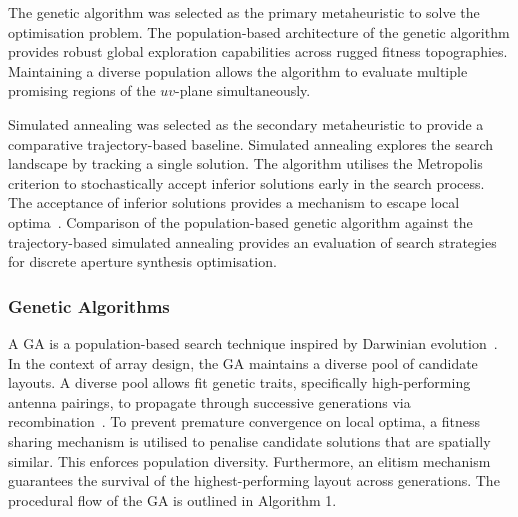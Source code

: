 \documentclass[conference]{IEEEtran}
\begin{document}
The genetic algorithm was selected as the primary metaheuristic to solve the optimisation problem. 
The population-based architecture of the genetic algorithm provides robust global exploration capabilities 
across rugged fitness topographies. Maintaining a diverse population allows the algorithm to evaluate multiple 
promising regions of the $uv$-plane simultaneously. 

Simulated annealing was selected as the secondary metaheuristic to provide a comparative trajectory-based 
baseline. Simulated annealing explores the search landscape by tracking a single solution. 
The algorithm utilises the Metropolis criterion to stochastically accept inferior solutions 
early in the search process. The acceptance of inferior solutions provides a mechanism 
to escape local optima~\cite{engelbrecht2007}. Comparison of the population-based genetic algorithm against the trajectory-based 
simulated annealing provides an evaluation of search strategies for discrete aperture synthesis 
optimisation.

\subsubsection{Genetic Algorithms}
A GA is a population-based search technique inspired by Darwinian evolution~\cite{engelbrecht2007}. In the context of 
array design, the GA maintains a diverse pool of candidate layouts. A diverse pool allows fit genetic traits, 
specifically high-performing antenna pairings, to propagate through successive generations via 
recombination~\cite{bremermann1962}. To prevent premature convergence on local optima, a fitness 
sharing mechanism is utilised to penalise candidate solutions that are spatially similar. This 
enforces population diversity. Furthermore, an elitism mechanism guarantees the survival of the 
highest-performing layout across generations. The procedural flow of the GA is outlined in Algorithm 1.
\end{document}
